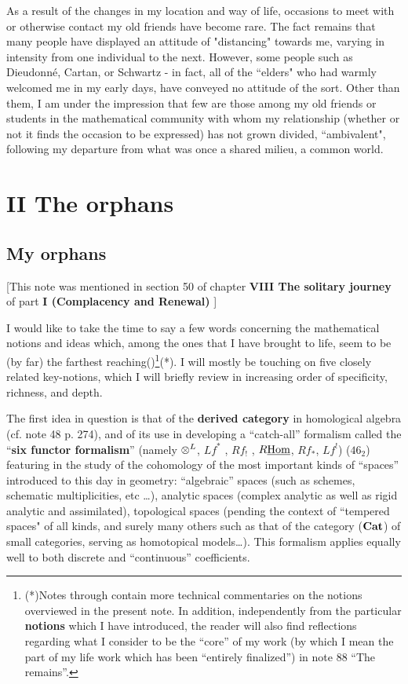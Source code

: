  As a result of the changes in my location and way of life, occasions to meet with or otherwise contact my old friends have become rare. The fact remains that many people have displayed an attitude of "distancing" towards me, varying in intensity from one individual to the next. However, some people such as Dieudonn\'e, Cartan, or Schwartz - in fact, all of the ``elders" who had warmly welcomed me in my early days, have conveyed no attitude of the sort. Other than them, I am under the impression that few are those among my old friends or students in the mathematical community with whom my relationship (whether or not it finds the occasion to be expressed) has not grown divided, ``ambivalent", following my departure from what was once a shared milieu, a common world.

\section{II The orphans}

\subsection{My orphans}

\label{note:46}
[This note was mentioned in section 50 of chapter \textbf{VIII The solitary journey} of
part \textbf{I (Complacency and Renewal)}
]

I would like to take the time to say a few words concerning the mathematical notions and
ideas which, among the ones that I have brought to life, seem to be (by far) the farthest
reaching()\footnote{(*)Notes \no {} through 
 contain more technical
commentaries on the notions overviewed in the present note. In addition, independently from
the particular \textbf{notions} which I have introduced, the reader will also find reflections
regarding what I consider to be the ``core'' of my work (by which I mean the part of my life work
which has been ``entirely finalized'') in note \no $88$ ``The remains''.}(*).
I will mostly be touching on five closely related key-notions, 
which I will briefly review in increasing order of specificity, richness, and depth.

The first idea in question is that of the \textbf{derived category} in homological algebra
(cf. note 48 p. 274), and of its use in developing a ``catch-all'' formalism called the 
``\textbf{six functor formalism}''
(namely $\otimes^L$, $Lf^*$ , $Rf_!$ , $R\underline{\operatorname{Hom}}$, $Rf_*$, $Lf^!$)
($46_2$) featuring in the study of the cohomology of the most important kinds of ``spaces'' introduced to this
day in geometry: ``algebraic'' spaces (such as schemes, schematic
multiplicities, etc \ldots), analytic spaces (complex analytic as well as
rigid analytic and assimilated), topological spaces (pending the context
of ``tempered spaces" of all kinds, and surely many others such as that of the category
($\mathbf{Cat}$) of small categories, serving as homotopical models\ldots).
This formalism applies equally well to both discrete and ``continuous'' coefficients.

